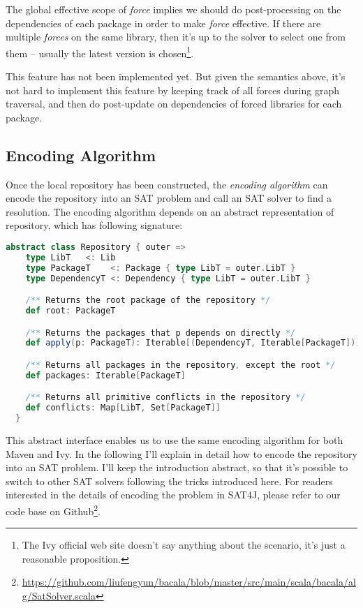 The global effective scope of \emph{force} implies we should do post-processing on the dependencies of each package in order to make \emph{force} effective. If there are multiple \emph{forces} on the same library, then it's up to the solver to select one from them -- usually the latest version is chosen\footnote{The Ivy official web site doesn't say anything about the scenario, it's just a reasonable proposition.}.

This feature has not been implemented yet. But given the semantics above, it's not hard to implement this feature by keeping track of all forces during graph traversal, and then do post-update on dependencies of forced libraries for each package.

\subsection{Encoding Algorithm}

Once the local repository has been constructed, the \emph{encoding algorithm} can encode the repository into an SAT problem and call an SAT solver to find a resolution. The encoding algorithm depends on an abstract representation of repository, which has following signature:

\begin{lstlisting}[language=Scala]
  abstract class Repository { outer =>
    type LibT   <: Lib
    type PackageT    <: Package { type LibT = outer.LibT }
    type DependencyT <: Dependency { type LibT = outer.LibT }

    /** Returns the root package of the repository */
    def root: PackageT

    /** Returns the packages that p depends on directly */
    def apply(p: PackageT): Iterable[(DependencyT, Iterable[PackageT])]

    /** Returns all packages in the repository, except the root */
    def packages: Iterable[PackageT]

    /** Returns all primitive conflicts in the repository */
    def conflicts: Map[LibT, Set[PackageT]]
  }
\end{lstlisting}

This abstract interface enables us to use the same encoding algorithm for both Maven and Ivy. In the following I'll explain in detail how to encode the repository into an SAT problem. I'll keep the introduction abstract, so that it's possible to switch to other SAT solvers following the tricks introduced here. For readers interested in the details of encoding the problem in SAT4J, please refer to our code base on Github\footnote{\url{https://github.com/liufengyun/bacala/blob/master/src/main/scala/bacala/alg/SatSolver.scala}}.

